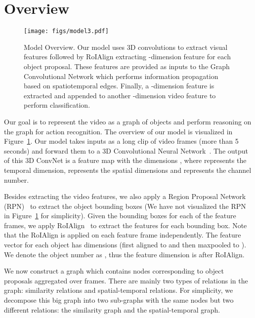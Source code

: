 \documentclass[runningheads]{llncs}
\begin{document}
\section{Overview}
\vspace{-0.1in}
\begin{figure}[t]
\centering
\texttt{[image: figs/model3.pdf]}
\vspace{-2.1em}
\caption{Model Overview. Our model uses 3D convolutions to extract visual features followed by RoIAlign extracting -dimension feature for each object proposal. These features are provided as inputs to the Graph Convolutional Network which performs information propagation based on spatiotemporal edges. Finally, a -dimension feature is extracted and appended to another -dimension video feature to perform classification.}
\label{fig:overview}
\vspace{-1em}
\end{figure}

Our goal is to represent the video as a graph of objects and perform reasoning on the graph for action recognition. The overview of our model is visualized in Figure~\ref{fig:overview}. Our model takes inputs as a long clip of video frames (more than 5 seconds) and forward them to a 3D Convolutional Neural Network~\cite{Carreira2017,xiaolongwang2017nonlocal}. The output of this 3D ConvNet is a feature map with the dimensions , where  represents the temporal dimension,  represents the spatial dimensions and  represents the channel number. 

Besides extracting the video features, we also apply a Region Proposal Network (RPN)~\cite{Ren2015} to extract the object bounding boxes (We have not visualized the RPN in Figure~\ref{fig:overview} for simplicity). Given the bounding boxes for each of the  feature frames, we apply  RoIAlign~\cite{Girshick2015,He2017} to extract the features for each bounding box.  Note that the RoIAlign is applied on each feature frame independently. The feature vector for each object has  dimensions (first aligned to  and then maxpooled to ). We denote the object number as , thus the feature dimension is  after RoIAlign.

We now construct a graph which contains  nodes corresponding to  object proposals aggregated over  frames. There are mainly two types of relations in the graph: similarity relations and spatial-temporal relations. For simplicity, we decompose this big graph into two sub-graphs with the same nodes but two different relations: the similarity graph and the spatial-temporal graph.  
\end{document}
